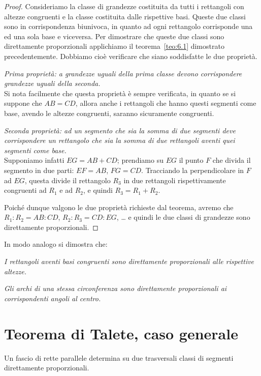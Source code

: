 \begin{proof}
Consideriamo la classe di grandezze costituita da tutti i rettangoli con altezze congruenti e la classe costituita dalle rispettive basi. Queste due classi sono in corrispondenza biunivoca, in quanto ad ogni rettangolo corrisponde una ed una sola base e viceversa.
Per dimostrare che queste due classi sono direttamente proporzionali applichiamo il teorema~\ref{teo:6.1} dimostrato precedentemente. Dobbiamo cioè verificare che siano soddisfatte le due proprietà.

\emph{Prima proprietà: a grandezze uguali della prima classe devono corrispondere grandezze uguali della seconda.}\\
Si nota facilmente che questa proprietà è sempre verificata, in quanto se si suppone che $AB = CD$, allora anche i rettangoli che hanno questi segmenti come base, avendo le altezze congruenti, saranno sicuramente congruenti.

\emph{Seconda proprietà: ad un segmento che sia la somma di due segmenti deve corrispondere un rettangolo che sia la somma di due rettangoli aventi quei segmenti come base.}\\
Supponiamo infatti $EG =  AB + CD$; prendiamo su $EG$ il punto $F$ che divida il segmento in due parti: $EF=AB$, $FG=CD$. Tracciando la perpendicolare in $F$ ad $EG$, questa divide il rettangolo $R_3$ in due rettangoli rispettivamente congruenti ad $R_1$ e ad $R_2$, e quindi $R_3= R_1+R_2$.

Poiché dunque valgono le due proprietà richieste dal teorema, avremo che $R_1 : R_2 = AB : CD$, 
$R_2 : R_3 = CD  : EG$, \ldots{} e quindi le due classi di grandezze sono direttamente proporzionali.
\end{proof}

In modo analogo si dimostra che:
\begin{itemize*}
\item \emph{I rettangoli aventi basi congruenti sono direttamente proporzionali alle rispettive altezze.}
\item \emph{Gli archi di una stessa circonferenza sono direttamente proporzionali ai corrispondenti angoli al centro.}
\end{itemize*}


\section{Teorema di Talete, caso generale}

\begin{teorema}[di Talete]
Un fascio di rette parallele determina su due trasversali classi di segmenti direttamente proporzionali.
\end{teorema}

